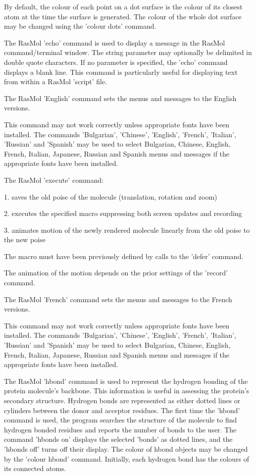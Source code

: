 By default, the colour of each point on a dot surface is the colour
of its closest atom at the time the surface is generated. The colour
of the whole dot surface may be changed using the
'colour dots'
command.

The RasMol
'echo'
command is used to display a message in the RasMol command/terminal
window. The string parameter may optionally be delimited in double
quote characters. If no parameter is specified, the
'echo'
command displays a blank line. This command is particularly useful
for displaying text from within a RasMol
'script'
file.

The RasMol
'English'
command sets the menus and messages to the English versions.

This command may not work correctly unless appropriate fonts
have been installed.  The commands
'Bulgarian',
'Chinese',
'English',
'French',
'Italian',
'Russian'
and
'Spanish'
may be used to select Bulgarian, Chinese, English, French,
Italian, Japanese, Russian and Spanish menus and messages if the
appropriate fonts have been installed.

The RasMol
'execute'
command:

1.  saves the old poise of the molecule (translation,
rotation and zoom)

2. executes the specified macro suppressing both screen
updates and recording

3. animates motion of the newly rendered molecule linearly
from the old poise to the new poise

The macro must have been previously defined by calls to the
'defer'
command.

The animation of the motion depends on the prior settings of the
'record'
command.

The RasMol
'French'
command sets the menus and messages to the French versions.

This command may not work correctly unless appropriate fonts
have been installed.  The commands
'Bulgarian',
'Chinese',
'English',
'French',
'Italian',
'Russian'
and
'Spanish'
may be used to select Bulgarian, Chinese, English, French,
Italian, Japanese, Russian and Spanish menus and messages if the
appropriate fonts have been installed.

The RasMol
'hbond'
command is used to represent the hydrogen bonding of the protein
molecule's backbone. This information is useful in assessing the
protein's secondary structure. Hydrogen bonds are represented as
either dotted lines or cylinders between the donor and acceptor
residues. The first time the
'hbond'
command is used, the program searches the structure of the
molecule to find hydrogen bonded residues and reports the number of bonds
to the user. The command
'hbonds on'
displays the selected 'bonds' as dotted lines, and the
'hbonds off'
turns off their display. The colour of hbond objects may be changed
by the
'colour hbond'
command. Initially, each hydrogen bond has the colours of its connected
atoms.

